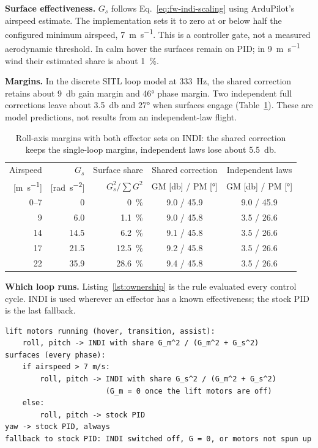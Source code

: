 \documentclass{article}
\begin{document}
\textbf{Surface effectiveness.} $G_s$ follows Eq.~\eqref{eq:fw-indi-scaling} using ArduPilot's airspeed estimate. The implementation sets it to zero at or below half the configured minimum airspeed, \SI{7}{\meter\per\second}. This is a controller gate, not a measured aerodynamic threshold. In calm hover the surfaces remain on PID; in \SI{9}{\meter\per\second} wind their estimated share is about \SI{1}{\percent}.

\textbf{Margins.} In the discrete SITL loop model at \SI{333}{\hertz}, the shared correction retains about \SI{9}{\decibel} gain margin and \ang{46} phase margin. Two independent full corrections leave about \SI{3.5}{\decibel} and \ang{27} when surfaces engage (Table~\ref{tab:joint-margins}). These are model predictions, not results from an independent-law flight.

\begin{table}[H]
\centering
\caption{Roll-axis margins with both effector sets on INDI: the shared correction keeps the single-loop margins, independent laws lose about \SI{5.5}{\decibel}.}
\label{tab:joint-margins}
\begin{tabular}{rrrcc}
\hline
Airspeed & $G_s$ & Surface share & Shared correction & Independent laws \\
{[\si{\meter\per\second}]} & [\si{\radian\per\second\squared}] & $G_s^2/\sum G^2$ & GM [\si{\decibel}] / PM [\si{\degree}] & GM [\si{\decibel}] / PM [\si{\degree}] \\
\hline
0--7 & 0    & \SI{0}{\percent}    & 9.0 / 45.9 & 9.0 / 45.9 \\
\hline
9    & 6.0  & \SI{1.1}{\percent}  & 9.0 / 45.8 & 3.5 / 26.6 \\
\hline
14   & 14.5 & \SI{6.2}{\percent}  & 9.1 / 45.8 & 3.5 / 26.6 \\
\hline
17   & 21.5 & \SI{12.5}{\percent} & 9.2 / 45.8 & 3.5 / 26.6 \\
\hline
22   & 35.9 & \SI{28.6}{\percent} & 9.4 / 45.8 & 3.5 / 26.6 \\
\hline
\end{tabular}
\end{table}

\textbf{Which loop runs.} Listing~\ref{lst:ownership} is the rule evaluated every control cycle. INDI is used wherever an effector has a known effectiveness; the stock PID is the last fallback.

\begin{lstlisting}[style=pseudostyle, caption={INDI and PID per effector set, every control cycle.}, label={lst:ownership}]
lift motors running (hover, transition, assist):
    roll, pitch -> INDI with share G_m^2 / (G_m^2 + G_s^2)
surfaces (every phase):
    if airspeed > 7 m/s:
        roll, pitch -> INDI with share G_s^2 / (G_m^2 + G_s^2)
                       (G_m = 0 once the lift motors are off)
    else:
        roll, pitch -> stock PID
yaw -> stock PID, always
fallback to stock PID: INDI switched off, G = 0, or motors not spun up
\end{lstlisting}
\end{document}
